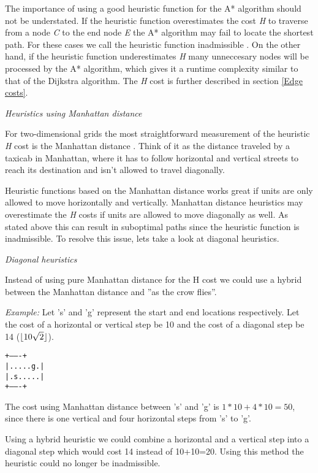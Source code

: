 \documentclass[12pt, a4paper]{article}
\DeclarePairedDelimiter{\floor}{\lfloor}{\rfloor}
\begin{document}
The importance of using a good heuristic function for the A* algorithm should
not be understated. If the heuristic function overestimates the cost \textit{H}
to traverse from a node \textit{C} to the end node \textit{E} the A* algorithm
may fail to locate the shortest path. For these cases we call the heuristic
function inadmissible \cite{astar2}. On the other hand, if the heuristic
function underestimates \textit{H} many unneccesary nodes will be processed by
the A* algorithm, which gives it a runtime complexity similar to that of the
Dijkstra algorithm. The \textit{H} cost is further described in section
\ref{Edge costs}.

\textit{Heuristics using Manhattan distance}

For two-dimensional grids the most straightforward measurement of the heuristic
\textit{H} cost is the Manhattan distance \cite{manhattan}. Think of it as the
distance traveled by a taxicab in Manhattan, where it has to follow horizontal
and vertical streets to reach its destination and isn't allowed to travel
diagonally.

Heuristic functions based on the Manhattan distance works great if units are
only allowed to move horizontally and vertically. Manhattan distance heuristics
may overestimate the \textit{H} costs if units are allowed to move diagonally as
well. As stated above this can result in suboptimal paths since the heuristic
function is inadmissible. To resolve this issue, lets take a look at diagonal
heuristics.

\textit{Diagonal heuristics}

Instead of using pure Manhattan distance for the H cost we could use a hybrid
between the Manhattan distance and ''as the crow flies''.

\textit{Example:} Let 's' and 'g' represent the start and end locations
respectively. Let the cost of a horizontal or vertical step be 10 and the cost
of a diagonal step be 14 ($ \floor{10 \sqrt{2}} $).

\texttt{+-------+ \\
|.....g.| \\
|.s.....| \\
+-------+}

The cost using Manhattan distance between 's' and 'g' is $ 1*10 + 4*10 = 50 $,
since there is one vertical and four horizontal steps from 's' to 'g'.

Using a hybrid heuristic we could combine a horizontal and a vertical step into
a diagonal step which would cost 14 instead of 10+10=20. Using this method the
heuristic could no longer be inadmissible.
\end{document}
